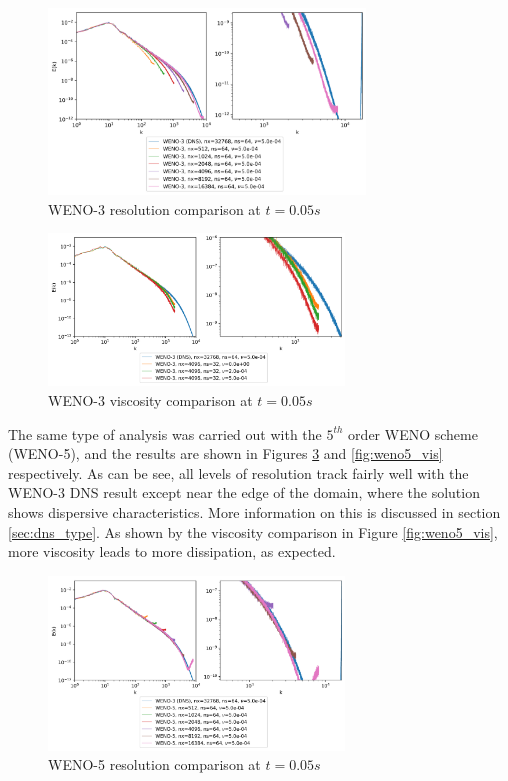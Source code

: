 \documentclass[conf]{new-aiaa}
\begin{document}
\begin{figure}[hbt!]
	\centering
	\includegraphics[width=0.75\textwidth]{figures/WENO3_Resolution_Comparison_Ek_vs_k.png}
	\caption{WENO-3 resolution comparison at $t=0.05s$}
	\label{fig:weno3_res}
\end{figure}

\begin{figure}[hbt!]
	\centering
	\includegraphics[width=0.7\textwidth]{figures/WENO3_Viscosity_Comparison_Ek_vs_k.png}
	\caption{WENO-3 viscosity comparison at $t=0.05s$}
	\label{fig:weno3_vis}
\end{figure}

The same type of analysis was carried out with the $5^{th}$ order WENO scheme
(WENO-5), and the results are shown in Figures \ref{fig:weno5_res} and
\ref{fig:weno5_vis} respectively. As can be see, all levels of resolution track
fairly well with the WENO-3 DNS result except near the edge of the domain,
where the solution shows dispersive characteristics. More information on this
is discussed in section \ref{sec:dns_type}. As shown by the viscosity comparison in
Figure \ref{fig:weno5_vis}, more viscosity leads to more dissipation, as
expected.

\begin{figure}[hbt!]
	\centering
	\includegraphics[width=0.7\textwidth]{figures/WENO5_Resolution_Comparison_Ek_vs_k.png}
	\caption{WENO-5 resolution comparison at $t=0.05s$}
	\label{fig:weno5_res}
\end{figure}
\end{document}
